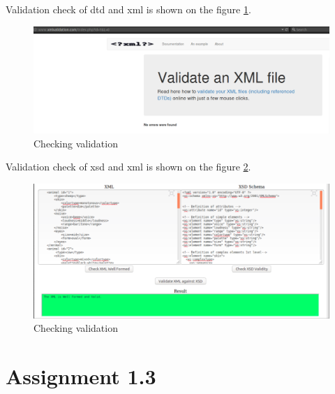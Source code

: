 \documentclass{article}
\begin{document}
Validation check of dtd and xml is shown on the figure \ref{fig:xml_dtd}.
\begin{figure}[h!]
    \centering
    \includegraphics[width=16cm]{xml_dtd_valid.png}
    \caption{Checking validation}
    \label{fig:xml_dtd}
\end{figure}

Validation check of xsd and xml is shown on the figure \ref{fig:validation}.

\begin{figure}[h!]
    \centering
    \includegraphics[width=16cm]{val.png}
    \caption{Checking validation}
    \label{fig:validation}
\end{figure}


\newpage
\section{Assignment 1.3}
\end{document}
